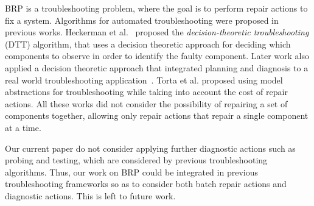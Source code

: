 \documentclass[review]{elsarticle}
\newcommand{\shortcite}{\cite}
\begin{document}
BRP is a troubleshooting problem, where the goal is to perform repair actions to fix a system. Algorithms for automated troubleshooting were proposed in previous works. Heckerman et al.~\shortcite{heckerman1995decision} proposed the {\em decision-theoretic troubleshooting} (DTT) algorithm, that uses a decision theoretic approach for deciding which components to observe in order to identify the faulty component. Later work also applied a decision theoretic approach that integrated planning and diagnosis to a real world troubleshooting application~\cite{Nyberg12,warnquist2009planning}. Torta et al. \shortcite{Torta14} proposed using model abstractions for troubleshooting while taking into account the cost of repair actions. All these works did not consider the possibility of repairing a set of components together, allowing only repair actions that repair a single component at a time.

Our current paper do not consider applying further diagnostic actions such as probing and testing, which are considered by previous troubleshooting algorithms. Thus, our work on BRP could be integrated in previous troubleshooting frameworks so as to consider both batch repair actions and diagnostic actions. This is left to future work.

\end{document}
